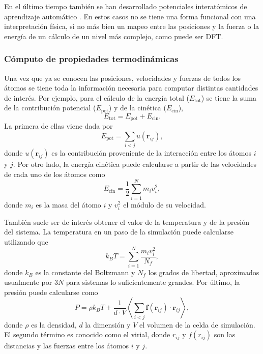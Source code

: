 En el último tiempo también se han desarrollado potenciales interatómicos de 
aprendizaje automático \cite{behler2016, behler2017, deringer2019}. En estos 
casos no se tiene una forma funcional con una interpretación física, si no más 
bien un mapeo entre las posiciones y la fuerza o la energía de un cálculo de un 
nivel más complejo, como puede ser DFT.


\subsubsection{Cómputo de propiedades termodinámicas}

Una vez que ya se conocen las posiciones, velocidades y fuerzas de todos los 
átomos se tiene toda la información necesaria para computar distintas cantidades 
de interés. Por ejemplo, para el cálculo de la energía total ($E_{\text{tot}}$) 
se tiene la suma de la contribución potencial ($E_{\text{pot}}$) y de la cinética
($E_{\text{cin}}$),
\begin{equation}
    E_{\text{tot}} = E_{\text{pot}} + E_{\text{cin}}.
\end{equation}
La primera de ellas viene dada por 
\begin{equation}
    E_{\text{pot}} = \sum_{i < j} u(\mathbf{r}_{ij}),
\end{equation}
donde $u(\mathbf{r}_{ij})$ es la contribución proveniente de la interacción 
entre los átomos $i$ y $j$. Por otro lado, la energía cinética puede calcularse a
partir de las velocidades de cada uno de los átomos como
\begin{equation}
    E_{\text{cin}} = \frac{1}{2} \sum_{i=1}^{N} m_i v_i^2, 
\end{equation}
donde $m_i$ es la masa del átomo $i$ y $v_i^2$ el módulo de su velocidad. 

También suele ser de interés obtener el valor de la temperatura y de la presión
del sistema. La temperatura en un paso de la simulación puede calcularse 
utilizando que
\begin{equation}\label{eq:tempvel}
    k_B T = \sum_{i=1}^N \frac{m_i v_i^2}{N_f},
\end{equation}
donde $k_B$ es la constante del Boltzmann y $N_f$ los grados de libertad,
aproximados usualmente por $3N$ para sistemas lo suficientemente grandes. Por 
último, la presión puede calcularse como 
\begin{equation}
P = \rho k_B T + \frac{1}{d \cdot V} \left\langle \sum_{i<j} \mathbf{f}(\mathbf{r}_{ij}) \cdot \mathbf{r}_{ij} \right\rangle,
\end{equation}
donde $\rho$ es la densidad, $d$ la dimensión y $V$ el volumen de la celda de 
simulación. El segundo término es conocido como el virial, donde $r_{ij}$ y 
$f(r_{ij})$ son las distancias y las fuerzas entre los átomos $i$ y $j$.


